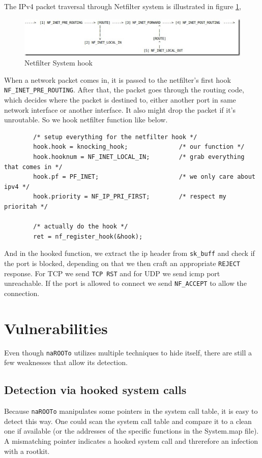 \documentclass[10pt, letterpaper]{scrartcl}
\begin{document}
The IPv4 packet traversal through Netfilter system is illustrated in figure \ref{netfilter}, 
\begin{figure}
\centerline{
\includegraphics[width=1.0\columnwidth]{netfilter.jpg}
}
\caption{Netfilter System hook}
\label{netfilter}
\end{figure}

When a network packet comes in, it is passed to the netfilter’s first hook \texttt{NF\_INET\_PRE\_ROUTING}. After that, the packet goes through the routing code, which decides where the packet is destined to, either another port in same network interface or another interface. It also might drop the packet if it’s unroutable. So we hook netfilter function like below. 

\begin{verbatim}
        /* setup everything for the netfilter hook */
        hook.hook = knocking_hook;              /* our function */
        hook.hooknum = NF_INET_LOCAL_IN;        /* grab everything that comes in */
        hook.pf = PF_INET;                      /* we only care about ipv4 */
        hook.priority = NF_IP_PRI_FIRST;        /* respect my prioritah */

        /* actually do the hook */
        ret = nf_register_hook(&hook);
\end{verbatim} 

And in the hooked function, we extract the ip header from \texttt{sk\_buff} and check if the port is blocked, depending on that we then craft an appropriate \texttt{REJECT} response. For TCP we send \texttt{TCP RST} and for UDP we send icmp port unreachable. If the port is allowed to connect we send \texttt{NF\_ACCEPT} to allow the connection.

\section{Vulnerabilities}
Even though \texttt{naROOTo} utilizes multiple techniques to hide itself, there are still a few weaknesses that allow its detection.

\subsection{Detection via hooked system calls}
Because \texttt{naROOTo} manipulates some pointers in the system call table, it is easy to detect this way.
One could scan the system call table and compare it to a clean one if available (or the addresses of the specific functions in the System.map file).
A mismatching pointer indicates a hooked system call and threrefore an infection with a rootkit.
\end{document}

